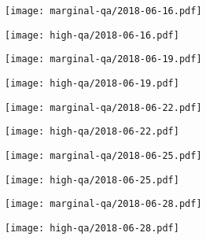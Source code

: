 \documentclass{article}
\begin{document}
\begin{figure}[H]
	\ContinuedFloat
	\centering
	\begin{subfigure}{0.48\linewidth}
		\texttt{[image: marginal-qa/2018-06-16.pdf]}
	\end{subfigure}
	\begin{subfigure}{0.48\linewidth}
		\texttt{[image: high-qa/2018-06-16.pdf]}
	\end{subfigure}
	\begin{subfigure}{0.48\linewidth}
		\texttt{[image: marginal-qa/2018-06-19.pdf]}
	\end{subfigure}
	\begin{subfigure}{0.48\linewidth}
		\texttt{[image: high-qa/2018-06-19.pdf]}
	\end{subfigure}
	\begin{subfigure}{0.48\linewidth}
		\texttt{[image: marginal-qa/2018-06-22.pdf]}
	\end{subfigure}
	\begin{subfigure}{0.48\linewidth}
		\texttt{[image: high-qa/2018-06-22.pdf]}
	\end{subfigure}
	\begin{subfigure}{0.48\linewidth}
		\texttt{[image: marginal-qa/2018-06-25.pdf]}
	\end{subfigure}
	\begin{subfigure}{0.48\linewidth}
		\texttt{[image: high-qa/2018-06-25.pdf]}
	\end{subfigure}
	\begin{subfigure}{0.48\linewidth}
		\texttt{[image: marginal-qa/2018-06-28.pdf]}
	\end{subfigure}
	\begin{subfigure}{0.48\linewidth}
		\texttt{[image: high-qa/2018-06-28.pdf]}
	\end{subfigure}
\end{figure}
\end{document}
